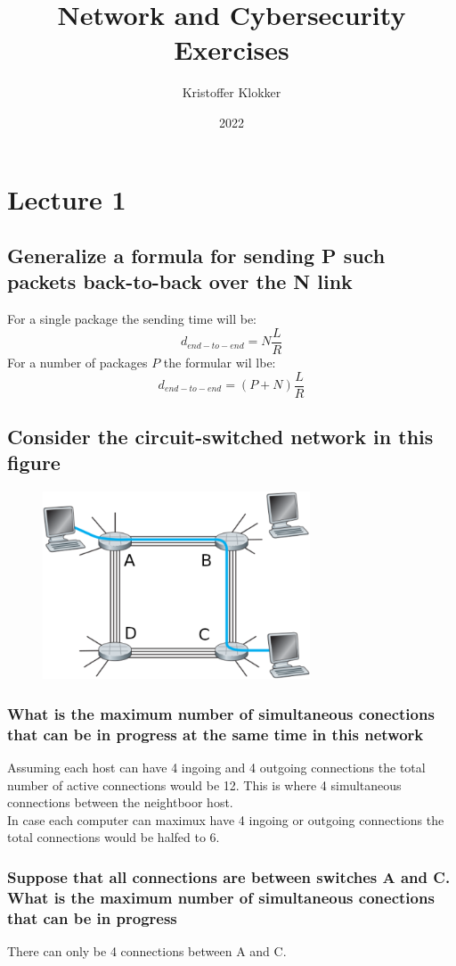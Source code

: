 \documentclass[12pt, a4paper]{article}
\title{Network and Cybersecurity\\ Exercises}
\date{2022}
\author{Kristoffer Klokker}
\begin{document}
	\maketitle
	\clearpage
	\tableofcontents
	\clearpage
	\section{Lecture 1}
		\subsection{Generalize a formula for sending P such packets back-to-back over the N link}
			For a single package the sending time will be:
			$$d_{end-to-end}=N\frac{L}{R}$$
			For a number of packages $P$ the formular wil lbe:
			$$d_{end-to-end}=(P+N)\frac{L}{R}$$
		\subsection{Consider the circuit-switched network in this figure}
			\begin{figure}[h!]
				\includegraphics[width=300px]{assets/1.1.png}
				\center
			\end{figure}
			\subsubsection{What is the maximum number of simultaneous conections that can be in progress at the same time in this network}
				Assuming each host can have 4 ingoing and 4 outgoing connections the total number of active connections would be 12. This is where 4 simultaneous connections between the neightboor host.\\
				In case each computer can maximux have 4 ingoing or outgoing connections the total connections would be halfed to 6.
			\subsubsection{Suppose that all connections are between switches A and C. What is the maximum number of simultaneous conections that can be in progress}
				There can only be 4 connections between A and C.
\end{document}
